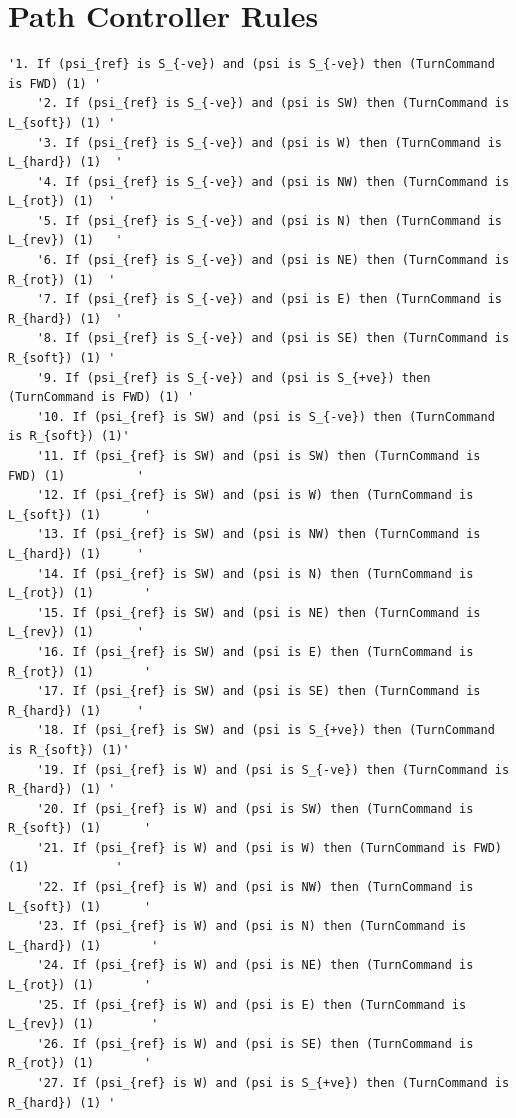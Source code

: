 \documentclass[10pt]{article}
\begin{document}
\pagebreak
\section{Path Controller Rules}

\begin{verbatim}
'1. If (psi_{ref} is S_{-ve}) and (psi is S_{-ve}) then (TurnCommand is FWD) (1) '
    '2. If (psi_{ref} is S_{-ve}) and (psi is SW) then (TurnCommand is L_{soft}) (1) '
    '3. If (psi_{ref} is S_{-ve}) and (psi is W) then (TurnCommand is L_{hard}) (1)  '
    '4. If (psi_{ref} is S_{-ve}) and (psi is NW) then (TurnCommand is L_{rot}) (1)  '
    '5. If (psi_{ref} is S_{-ve}) and (psi is N) then (TurnCommand is L_{rev}) (1)   '
    '6. If (psi_{ref} is S_{-ve}) and (psi is NE) then (TurnCommand is R_{rot}) (1)  '
    '7. If (psi_{ref} is S_{-ve}) and (psi is E) then (TurnCommand is R_{hard}) (1)  '
    '8. If (psi_{ref} is S_{-ve}) and (psi is SE) then (TurnCommand is R_{soft}) (1) '
    '9. If (psi_{ref} is S_{-ve}) and (psi is S_{+ve}) then (TurnCommand is FWD) (1) '
    '10. If (psi_{ref} is SW) and (psi is S_{-ve}) then (TurnCommand is R_{soft}) (1)'
    '11. If (psi_{ref} is SW) and (psi is SW) then (TurnCommand is FWD) (1)          '
    '12. If (psi_{ref} is SW) and (psi is W) then (TurnCommand is L_{soft}) (1)      '
    '13. If (psi_{ref} is SW) and (psi is NW) then (TurnCommand is L_{hard}) (1)     '
    '14. If (psi_{ref} is SW) and (psi is N) then (TurnCommand is L_{rot}) (1)       '
    '15. If (psi_{ref} is SW) and (psi is NE) then (TurnCommand is L_{rev}) (1)      '
    '16. If (psi_{ref} is SW) and (psi is E) then (TurnCommand is R_{rot}) (1)       '
    '17. If (psi_{ref} is SW) and (psi is SE) then (TurnCommand is R_{hard}) (1)     '
    '18. If (psi_{ref} is SW) and (psi is S_{+ve}) then (TurnCommand is R_{soft}) (1)'
    '19. If (psi_{ref} is W) and (psi is S_{-ve}) then (TurnCommand is R_{hard}) (1) '
    '20. If (psi_{ref} is W) and (psi is SW) then (TurnCommand is R_{soft}) (1)      '
    '21. If (psi_{ref} is W) and (psi is W) then (TurnCommand is FWD) (1)            '
    '22. If (psi_{ref} is W) and (psi is NW) then (TurnCommand is L_{soft}) (1)      '
    '23. If (psi_{ref} is W) and (psi is N) then (TurnCommand is L_{hard}) (1)       '
    '24. If (psi_{ref} is W) and (psi is NE) then (TurnCommand is L_{rot}) (1)       '
    '25. If (psi_{ref} is W) and (psi is E) then (TurnCommand is L_{rev}) (1)        '
    '26. If (psi_{ref} is W) and (psi is SE) then (TurnCommand is R_{rot}) (1)       '
    '27. If (psi_{ref} is W) and (psi is S_{+ve}) then (TurnCommand is R_{hard}) (1) '

\end{verbatim}
\end{document}
